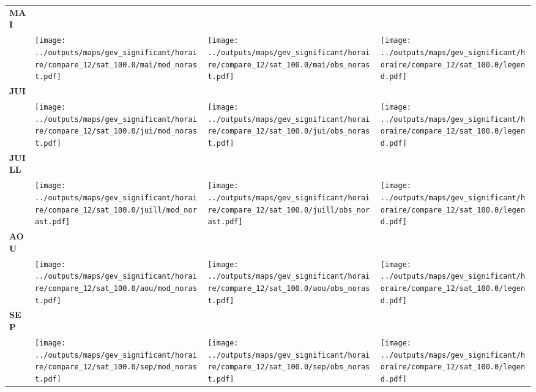 \documentclass[
  letterpaper,
  DIV=11,
  numbers=noendperiod]{scrartcl}
\begin{document}
\begin{longtable*}{m{2.0cm}m{7.9cm}m{7.9cm}m{1cm}}
\centering \textbf{MAI} \\[0.2em] \begin{tabular}{r@{\hspace{0.2em}}l}\end{tabular} & \centering \texttt{[image: ../outputs/maps/gev\_significant/horaire/compare\_12/sat\_100.0/mai/mod\_norast.pdf]} & \centering \texttt{[image: ../outputs/maps/gev\_significant/horaire/compare\_12/sat\_100.0/mai/obs\_norast.pdf]} & \centering \texttt{[image: ../outputs/maps/gev\_significant/horaire/compare\_12/sat\_100.0/legend.pdf]} \tabularnewline
\centering \textbf{JUI} \\[0.2em] \begin{tabular}{r@{\hspace{0.2em}}l}\end{tabular} & \centering \texttt{[image: ../outputs/maps/gev\_significant/horaire/compare\_12/sat\_100.0/jui/mod\_norast.pdf]} & \centering \texttt{[image: ../outputs/maps/gev\_significant/horaire/compare\_12/sat\_100.0/jui/obs\_norast.pdf]} & \centering \texttt{[image: ../outputs/maps/gev\_significant/horaire/compare\_12/sat\_100.0/legend.pdf]} \tabularnewline
\centering \textbf{JUILL} \\[0.2em] \begin{tabular}{r@{\hspace{0.2em}}l}\end{tabular} & \centering \texttt{[image: ../outputs/maps/gev\_significant/horaire/compare\_12/sat\_100.0/juill/mod\_norast.pdf]} & \centering \texttt{[image: ../outputs/maps/gev\_significant/horaire/compare\_12/sat\_100.0/juill/obs\_norast.pdf]} & \centering \texttt{[image: ../outputs/maps/gev\_significant/horaire/compare\_12/sat\_100.0/legend.pdf]} \tabularnewline
\centering \textbf{AOU} \\[0.2em] \begin{tabular}{r@{\hspace{0.2em}}l}\end{tabular} & \centering \texttt{[image: ../outputs/maps/gev\_significant/horaire/compare\_12/sat\_100.0/aou/mod\_norast.pdf]} & \centering \texttt{[image: ../outputs/maps/gev\_significant/horaire/compare\_12/sat\_100.0/aou/obs\_norast.pdf]} & \centering \texttt{[image: ../outputs/maps/gev\_significant/horaire/compare\_12/sat\_100.0/legend.pdf]} \tabularnewline
\centering \textbf{SEP} \\[0.2em] \begin{tabular}{r@{\hspace{0.2em}}l}\end{tabular} & \centering \texttt{[image: ../outputs/maps/gev\_significant/horaire/compare\_12/sat\_100.0/sep/mod\_norast.pdf]} & \centering \texttt{[image: ../outputs/maps/gev\_significant/horaire/compare\_12/sat\_100.0/sep/obs\_norast.pdf]} & \centering \texttt{[image: ../outputs/maps/gev\_significant/horaire/compare\_12/sat\_100.0/legend.pdf]} \tabularnewline

\end{longtable*}
\end{document}
